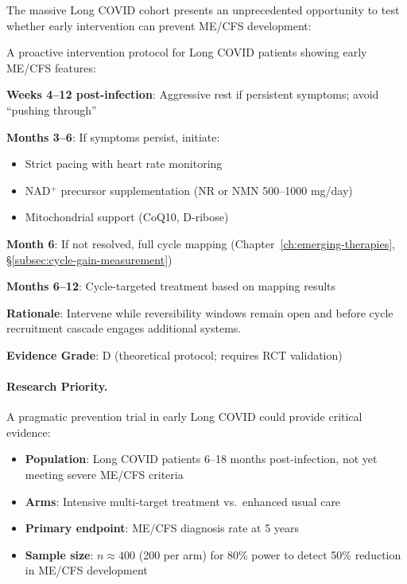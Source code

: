 The massive Long COVID cohort presents an unprecedented opportunity to test whether early intervention can prevent ME/CFS development:

\begin{speculation}
A proactive intervention protocol for Long COVID patients showing early ME/CFS features:

\textbf{Weeks 4--12 post-infection}: Aggressive rest if persistent symptoms; avoid ``pushing through''

\textbf{Months 3--6}: If symptoms persist, initiate:
\begin{itemize}
    \item Strict pacing with heart rate monitoring
    \item NAD$^+$ precursor supplementation (NR or NMN 500--1000 mg/day)
    \item Mitochondrial support (CoQ10, D-ribose)
\end{itemize}

\textbf{Month 6}: If not resolved, full cycle mapping (Chapter~\ref{ch:emerging-therapies}, \S\ref{subsec:cycle-gain-measurement})

\textbf{Months 6--12}: Cycle-targeted treatment based on mapping results

\textbf{Rationale}: Intervene while reversibility windows remain open and before cycle recruitment cascade engages additional systems.

\textbf{Evidence Grade}: D (theoretical protocol; requires RCT validation)
\end{speculation}

\paragraph{Research Priority.}

A pragmatic prevention trial in early Long COVID could provide critical evidence:

\begin{itemize}
    \item \textbf{Population}: Long COVID patients 6--18 months post-infection, not yet meeting severe ME/CFS criteria
    \item \textbf{Arms}: Intensive multi-target treatment vs.\ enhanced usual care
    \item \textbf{Primary endpoint}: ME/CFS diagnosis rate at 5 years
    \item \textbf{Sample size}: $n \approx 400$ (200 per arm) for 80\% power to detect 50\% reduction in ME/CFS development
\end{itemize}


